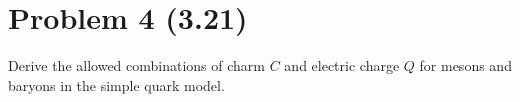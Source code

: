 \documentclass{article}
\begin{document}
\section*{Problem 4 (3.21)}
\begin{mdframed}
    Derive the allowed combinations of charm $C$ and electric charge $Q$ for mesons and baryons in the simple quark model. 
\end{mdframed}
\end{document}
